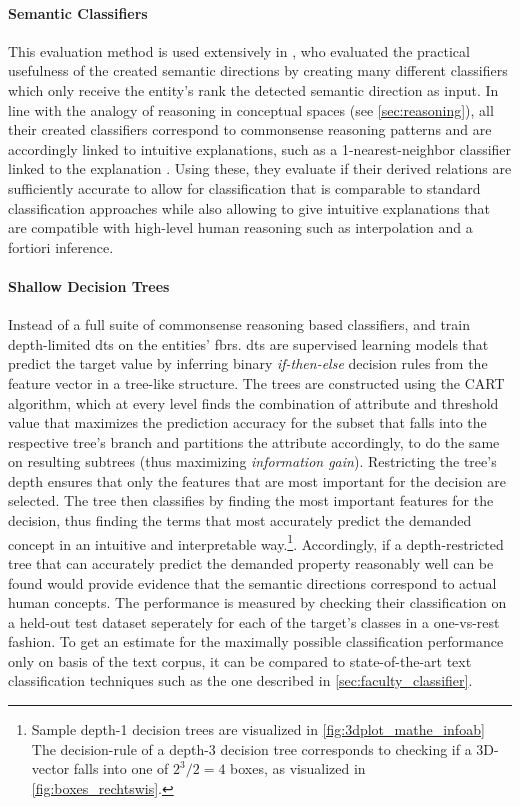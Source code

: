 \paragraph{Semantic Classifiers} This evaluation method is used extensively in \cite{Derrac2015}, who evaluated the practical usefulness of the created semantic directions by creating many different classifiers which only receive the entity's \gls{rank} \wrt the detected semantic direction as input. In line with the analogy of reasoning in conceptual spaces (see \ref{sec:reasoning}), all their created classifiers correspond to commonsense reasoning patterns and are accordingly linked to intuitive explanations, such as a 1-nearest-neighbor classifier linked to the explanation \textit{}. Using these, they evaluate if their derived relations are sufficiently accurate to allow for classification that is comparable to standard classification approaches while also allowing to give intuitive explanations that are compatible with high-level human reasoning such as interpolation and a fortiori inference.

\paragraph{Shallow Decision Trees} Instead of a full suite of commonsense reasoning based classifiers, \cite{Ager2018} and \cite{Alshaikh2020} train depth-limited \glspl{dt} \cite{breiman1984classification} on the entities' \glspl{fbr}. \Glspl{dt} are supervised learning models that predict the target value by inferring binary \textit{if-then-else} decision rules from the feature vector in a tree-like structure. The trees are constructed using the CART algorithm, which at every level finds the combination of attribute and threshold value that maximizes the prediction accuracy for the subset that falls into the respective tree's branch and partitions the attribute accordingly, to do the same on resulting subtrees (thus maximizing \emph{information gain}). %
Restricting the tree's depth ensures that only the features that are most important for the decision are selected. The tree then classifies by finding the most important features for the decision, thus finding the terms that most accurately predict the demanded concept in an intuitive and interpretable way.\footnote{Sample depth-1 decision trees are visualized in \autoref{fig:3dplot_mathe_infoab} The decision-rule of a depth-3 decision tree corresponds to checking if a 3D-vector falls into one of $2^3/2=4$ boxes, as visualized in \autoref{fig:boxes_rechtswis}.}. Accordingly, if a depth-restricted tree that can accurately predict the demanded property reasonably well can be found would provide evidence that the semantic directions correspond to actual human concepts. The performance is measured by checking their classification on a held-out test dataset seperately for each of the target's classes in a one-vs-rest fashion. To get an estimate for the maximally possible classification performance only on basis of the text corpus, it can be compared to state-of-the-art text classification techniques such as the one described in \autoref{sec:faculty_classifier}.

